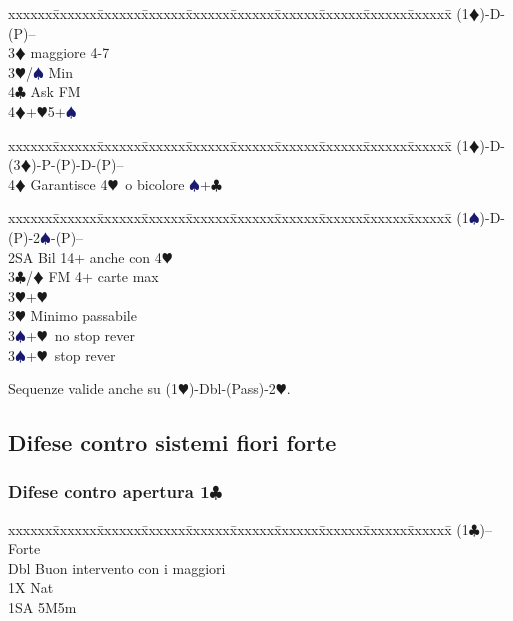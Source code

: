 \documentclass[a4paper,italian]{article}
\newcommand{\BC}{\textcolor{OliveGreen}{$\clubsuit$}}
\newcommand{\BD}{\textcolor{RedOrange}{$\vardiamondsuit$}}
\newcommand{\BH}{\textcolor{Red2}{$\varheartsuit${}}}
\newcommand{\BS}{\textcolor{MidnightBlue}{$\spadesuit${}}}
\newcommand{\pdfc}{\texorpdfstring{\BC{}}{C}}
\newenvironment{bidtable}
{\begin{tabbing}

    xxxxxx\=xxxxxx\=xxxxxx\=xxxxxx\=xxxxxx\=xxxxxx\=xxxxxx\=xxxxxx\=xxxxxx\=xxxxxx\=\kill}
{\end{tabbing} }%
\begin{document}
\begin{multicols}{2}
                                        \begin{bidtable}
                                            (1\BD)-D-(P)--\+\\
                                            3\BD {} maggiore 4-7\+\\
                                            3\BH/\BS \> Min\\
                                            4\BC \> Ask FM\-\\
                                            4\BD {}+\BH 5+\BS \-
                                        \end{bidtable}
                                        \begin{bidtable}
                                            (1\BD)-D-(3\BD)-P-(P)-D-(P)--\+\\
                                            4\BD \> Garantisce 4\BH\ o bicolore \BS +\BC \-
                                        \end{bidtable}
                                        \begin{bidtable}
                                            (1\BS)-D-(P)-2\BS-(P)--\+\\
                                            2SA \> Bil 14+ anche con 4\BH \\
                                            3\BC/\BD \> FM 4+ carte max\+\\
                                            3\BH {}+\BH \-\\
                                            3\BH \> Minimo passabile\\
                                            3\BS {}+\BH\ no stop rever\\
                                            3\BS {}+\BH\ stop rever\-
                                        \end{bidtable}

                                        Sequenze valide anche su (1\BH )-Dbl-(Pass)-2\BH .

                                        \subsection{Difese contro sistemi fiori forte}

                                        \subsubsection{Difese contro apertura 1\pdfc}
                                        \begin{bidtable}
                                            (1\BC)--\> Forte\\
                                            Dbl \> Buon intervento con i maggiori\\
                                            1X\> Nat\\
                                            1SA\> 5M5m
                                        \end{bidtable}

\end{multicols}
\end{document}
